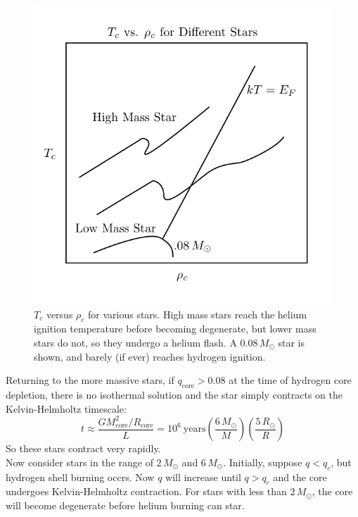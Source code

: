 \documentclass[10pt]{article}
\numberwithin{equation}{section}
\newcommand{\n}{\noindent}
\begin{document}
    \begin{figure}[h!]
      \centering
      \includegraphics{TcRhoc.pdf}
      \caption{$T_c$ versus $\rho_c$ for various stars. High mass stars 
reach the helium ignition temperature before becoming degenerate, but lower 
mass stars do not, so they undergo a helium flash. A $0.08\,M_\odot$ star 
is shown, and barely (if ever) reaches hydrogen ignition.}
      \label{fig:4}
    \end{figure}
    
    \n Returning to the more massive stars, if
    $q_{\mathrm{core}}>0.08$ at the time of hydrogen core depletion,
    there is no isothermal solution and the star simply contracts on
    the Kelvin-Helmholtz timescale:
    \begin{equation}
      \label{eq:263}
      t\approx \frac{GM_{\mathrm{core}}^2/R_{\mathrm{core}}}{L}=10^6\ 
\mathrm{years}\left(\frac{6\,M_\odot}{M}\right)\left(\frac{5\,R_\odot}{R}
\right)
    \end{equation}
    So these stars contract very rapidly.\\
    
    \n Now consider stars in the range of $2\,M_\odot$ and
    $6\,M_\odot$. Initially, suppose $q<q_c$, but hydrogen shell
    burning occrs. Now $q$ will increase until $q>q_c$ and the core
    undergoes Kelvin-Helmholtz contraction. For stars with less than
    $2\,M_\odot$, the core will become degenerate before helium
    burning can star.\\
\end{document}
